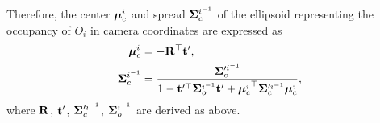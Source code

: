 \documentclass[10pt,twocolumn,letterpaper]{article}
\newcommand{\xmin}{x_\text{min}}
\newcommand{\xmax}{x_\text{max}}
\begin{document}
Therefore, the center ${{\bm{\mu}}^{i}_c}$ and spread $\bm{\Sigma}^{i^{-1}}_c$ of the ellipsoid representing the occupancy of $O_i$ in camera coordinates are expressed as
\begin{align}
  \label{eq:ellipsoidMeanSigma}
  {{\bm{\mu}}^{i}_c} &= - \mathbf{R}^\top \mathbf{t}', \\
  \bm{\Sigma}^{i^{-1}}_c &= \frac{\bm{\Sigma}'^{i^{-1}}_c}
{1 - \mathbf{t}'^\top \bm{\Sigma}^{i^{-1}}_o \mathbf{t}' + {{\bm{\mu}}^{i}_c}^\top\bm{\Sigma}'^{i^{-1}}_c{{\bm{\mu}}^{i}_c}},
\end{align}
where $\mathbf{R}$, $\mathbf{t}'$, $\bm{\Sigma}'^{i^{-1}}_c$, $\bm{\Sigma}^{i^{-1}}_o$ are derived as above.

\begin{comment}
\section{Projection of Ellipsoids to Image}
\newcommand{\mubar}{\bar{\mu}_i}
In general, the perspective projection of an ellipsoid to the image plane is not an ellipse. We describe below two reasonable approximate methods which project a slice of the ellipsoid to the image such that the projection is always an ellipse.

\subsection{Tangent plane method}
\newcommand{\nx}{\hat{n}_x}
We chose the slice as the plane passing through the four points that touch 
the tangent planes through the origin.
Let the normal to plane representing $\xmin$, $\xmax$ be $\nx = [\cot(\alpha),
0, 1]^\top$. The tangent point lies on the plane, ellipsoid and at
the tangent point the gradient of ellipsoid is parallel to the plane normal.
%
\begin{align}
  x^\top \nx = \nx^\top x &= 0\\
  (x-\muic)^\top\Sigmaicf(x-\muic) &= 1 \\
  2\Sigmaicf (x - \muic) &= \lambda \nx \enspace .
\end{align}%
%
Eliminating $x$ from the three equations we get,
%
\begin{align}
  \frac{ \lambda^2 }{ 4 } \nx^\top \Sigmaicfinv \nx &= 1\\
  \frac{ \lambda }{ 2 } \nx^\top \Sigmaicfinv \nx - \muic^\top \nx &= 0
\end{align}%
%
Solving for $\lambda$ we get $\lambda = \frac{ 2 \muic^\top \nx }{ \nx^\top \Sigmaicfinv \nx }$ or
%
\begin{align}
  \nx^\top \muic \muic^\top \nx &= \nx^\top \Sigmaicfinv \nx\\
  \nx^\top (\Sigmaicfinv - \muic \muic^\top) \nx &= 0
\end{align}%
%
Let $C := \Sigmaicfinv - \muic \muic^\top$ and the quadratic equation can be solved by
%
\begin{align}
  \cot(\alpha) &= \frac{ - C_{13} \pm \sqrt{ C^2_{13} - C_{11}C_{33} } }{ C_{11}  }
\end{align}%
%
Similarly for $\beta_y$


\end{comment}
\end{document}
